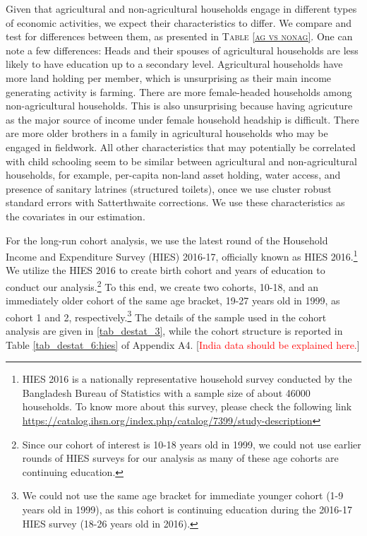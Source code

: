 \documentclass[12pt,letterpaper]{article}\usepackage[margin=1in]{geometry}
\newcommand{\SAdded}[1]{\textcolor{red}{#1}}
\newcommand{\0}{\ensuremath{\mbox{\boldmath $0$}}}
\begin{document}
Given that agricultural and non-agricultural households engage in different types of economic activities, we expect their characteristics to differ. We compare and test for differences between them, as presented in \textsc{\small Table \ref{ag vs nonag}}. One can note a few differences: Heads and their spouses of agricultural households are less likely to have education up to a secondary level. Agricultural households have more land holding per member, which is unsurprising as their main income generating activity is farming. There are more female-headed households among non-agricultural households. This is also unsurprising because having agricuture as the major source of income under female household headship is difficult. There are more older brothers in a family in agricultural households who may be engaged in fieldwork. All other characteristics that may potentially be correlated with child schooling seem to be similar between agricultural and non-agricultural households, for example, per-capita non-land asset holding, water access, and presence of sanitary latrines (structured toilets), once we use cluster robust standard errors with Satterthwaite corrections. We use these characteristics as the covariates in our estimation. 

For the long-run cohort analysis, we use the latest round of the Household Income and Expenditure Survey (HIES) 2016-17, officially known as HIES 2016.\footnote{HIES 2016 is a nationally representative household survey conducted by the Bangladesh Bureau of Statistics with a sample size of about 46000 households. To know more about this survey, please check the following link \url{https://catalog.ihsn.org/index.php/catalog/7399/study-description}} We utilize the HIES 2016 to create birth cohort and years of education to conduct our analysis.\footnote{Since our cohort of interest is 10-18 years old in 1999, we could not use earlier rounds of HIES surveys for our analysis as many of these age cohorts are continuing education.} To this end, we create two cohorts, 10-18, and an immediately older cohort of the same age bracket, 19-27 years old in 1999, as cohort 1 and 2, respectively.\footnote{We could not use the same age bracket for immediate younger cohort (1-9 years old in 1999), as this cohort is continuing education during the 2016-17 HIES survey (18-26 years old in 2016).} The details of the sample used in the cohort analysis are given in \ref{tab_destat_3}, while the cohort structure is reported in Table \ref{tab_destat_6:hies} of Appendix A4.  [\SAdded{India data should be explained here.}]
\end{document}

